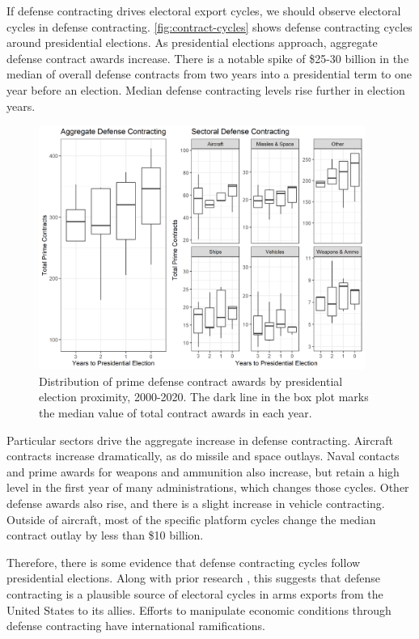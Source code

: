 \documentclass[12pt]{article}
\begin{document}
If defense contracting drives electoral export cycles, we should observe electoral cycles in defense contracting.
\autoref{fig:contract-cycles} shows defense contracting cycles around presidential elections. 
As presidential elections approach, aggregate defense contract awards increase. 
There is a notable spike of \$25-30 billion in the median of overall defense contracts from two years into a presidential term to one year before an election. 
Median defense contracting levels rise further in election years.


\begin{figure}[htpb]
	\centering
		\includegraphics[width=0.95\textwidth]{../figures/contract-cycles.png}
	\caption{Distribution of prime defense contract awards by presidential election proximity, 2000-2020. The dark line in the box plot marks the median value of total contract awards in each year.}
	\label{fig:contract-cycles}
\end{figure}


Particular sectors drive the aggregate increase in defense contracting. 
Aircraft contracts increase dramatically, as do missile and space outlays. 
Naval contacts and prime awards for weapons and ammunition also increase, but retain a high level in the first year of many administrations, which changes those cycles. 
Other defense awards also rise, and there is a slight increase in vehicle contracting. 
Outside of aircraft, most of the specific platform cycles change the median contract outlay by less than \$10 billion.


Therefore, there is some evidence that defense contracting cycles follow presidential elections.
Along with prior research \citep{DerouenHeo2000}, this suggests that defense contracting is a plausible source of electoral cycles in arms exports from the United States to its allies.
Efforts to manipulate economic conditions through defense contracting have international ramifications. 
\end{document}
